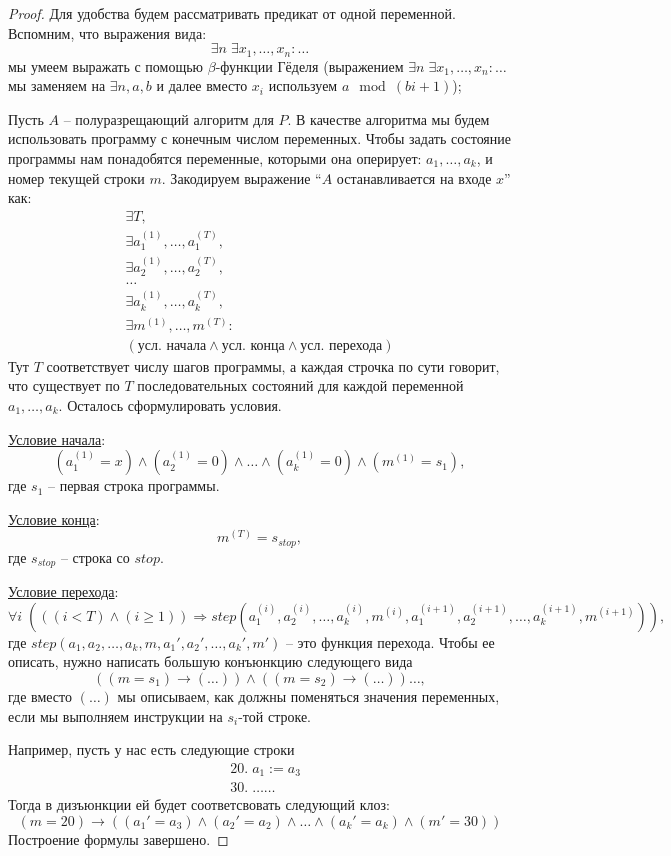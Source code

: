 \begin{proof}
    Для удобства будем рассматривать предикат от одной переменной. Вспомним, что выражения вида: \[ \exists n \; \exists x_1, \dots, x_n : \dots \] мы умеем выражать с помощью $\beta$-функции Гёделя (выражением $\exists n \; \exists x_1, \dots, x_n : \dots$ мы заменяем на $\exists n, a, b$ и далее вместо $x_i$ используем $a \mod (bi + 1)$); 

    Пусть $A$ -- полуразрещающий алгоритм для $P$. В качестве алгоритма мы будем использовать программу с конечным числом переменных. Чтобы задать состояние программы нам понадобятся переменные, которыми она оперирует: $a_1, \dots, a_k$, и номер текущей строки $m$. Закодируем выражение ``$A$ останавливается на входе $x$'' как: \begin{gather*}
        \exists T, \\
        \exists a_1^{(1)}, \dots, a_1^{(T)}, \\
        \exists a_2^{(1)}, \dots, a_2^{(T)}, \\
        \dots \\
        \exists a_k^{(1)}, \dots, a_k^{(T)}, \\
        \exists m^{(1)}, \dots, m^{(T)} : \\
        (\text{усл. начала} \land \text{усл. конца} \land \text{усл. перехода})
    \end{gather*}
    Тут $T$ соответствует числу шагов программы, а каждая строчка по сути говорит, что существует по $T$ последовательных состояний для каждой переменной $a_1, \dots, a_k$. Осталось сформулировать условия.

    \underline{Условие начала}: \[ (a_1^{(1)} = x) \land (a_2^{(1)} = 0) \land \dots \land (a_k^{(1)} = 0) \land (m^{(1)} = s_1), \] где $s_1$ -- первая строка программы.
    
    \underline{Условие конца}: \[ m^{(T)} = s_{stop}, \] где $s_{stop}$ -- строка со $stop$.

    \underline{Условие перехода}: \[ \forall i \; (((i < T) \land (i \geqslant 1)) \Rightarrow step(a_1^{(i)}, a_2^{(i)}, \dots, a_k^{(i)}, m^{(i)}, a_1^{(i+1)}, a_2^{(i+1)}, \dots, a_k^{(i+1)}, m^{(i+1)})), \] где $step(a_1, a_2, \dots, a_k, m, a_1', a_2', \dots, a_k', m')$ -- это функция перехода. Чтобы ее описать, нужно написать большую конъюнкцию следующего вида \[ ((m = s_1) \to (\dots)) \land ((m = s_2) \to (\dots)) \dots, \] где вместо $(\dots)$ мы описываем, как должны поменяться значения переменных, если мы выполняем инструкции на $s_i$-той строке.

    Например, пусть у нас есть следующие строки \begin{align*}
        &20. \; a_1 := a_3 \\
        &30. \; \dots \dots
    \end{align*}  
    Тогда в дизъюнкции ей будет соответсвовать следующий клоз: \[ (m = 20) \to ((a_1' = a_3) \land (a_2' = a_2) \land \dots \land (a_k' = a_k) \land(m' = 30)) \]
    Построение формулы завершено.
\end{proof}

